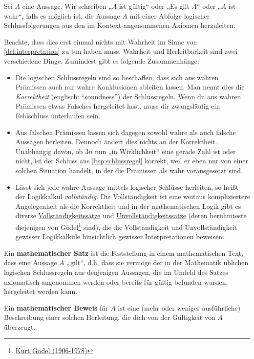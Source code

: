 \begin{defin}
    Sei $A$ eine Aussage. Wir schreiben „$A$ ist gültig“ oder „Es gilt $A$“ oder „$A$ ist wahr“, falls es möglich ist, die Aussage $A$ mit einer Abfolge logischer Schlussfolgerungen aus den im Kontext angenommenen Axiomen herzuleiten.
\end{defin}
 
 
\begin{bem} \label{beweisbarvswahr}
    Beachte, dass dies erst einmal nichts mit Wahrheit im Sinne von \cref{def:interpretation} zu tun haben muss. Wahrheit und Herleitbarkeit sind zwei verschiedene Dinge. Zumindest gibt es folgende Zusammenhänge:
    \begin{itemize}
        \item Die logischen Schlussregeln sind so beschaffen, dass sich aus wahren Prämissen auch nur wahre Konklusionen ableiten lassen. Man nennt dies die \emph{Korrektheit} (englisch: ``soundness'') der Schlussregeln. Wenn du aus wahren Prämissen etwas Falsches hergeleitet hast, muss dir zwangsläufig ein Fehlschluss unterlaufen sein.
        \item Aus falschen Prämissen lassen sich dagegen sowohl wahre als auch falsche Aussagen herleiten. Dennoch ändert dies nichts an der Korrektheit. Unabhängig davon, ob $3n$ nun „in Wirklichkeit“ eine gerade Zahl ist oder nicht, ist der Schluss aus \cref{bsp:schlussregel} korrekt, weil er eben nur von einer solchen Situation handelt, in der die Prämissen als wahr vorausgesetzt sind.
        \item Lässt sich jede wahre Aussage mittels logischer Schlüsse herleiten, so heißt der Logikkalkül \emph{vollständig}. Die Vollständigkeit ist eine weitaus kompliziertere Angelegenheit als die Korrektheit und in der mathematischen Logik gibt es diverse \href{https://ncatlab.org/nlab/show/completeness+theorem}{Vollständigkeitssätze} und \href{https://ncatlab.org/nlab/show/incompleteness+theorem}{Unvollständigkeitssätze} (deren berühmteste diejenigen von Gödel\footnote{\href{https://de.wikipedia.org/wiki/Kurt_G\%C3\%B6del}{Kurt Gödel (1906-1978)}} sind), die die Vollständigkeit und Unvollständigkeit gewisser Logikkalküle hinsichtlich gewisser Interpretationen beweisen.
    \end{itemize}
\end{bem}


\begin{defin} 
    Ein \textbf{mathematischer Satz} ist die Feststellung in einem mathematischen Text, dass eine Aussage $A$ „gilt“, d.h. dass sie vermöge der in der Mathematik üblichen logischen Schlussregeln aus denjenigen Aussagen, die im Umfeld des Satzes axiomatisch angenommen werden oder bereits für gültig befunden wurden, hergeleitet werden kann.
    
    Ein \textbf{mathematischer Beweis} für $A$ ist eine (mehr oder weniger ausführliche) Beschreibung einer solchen Herleitung, die dich von der Gültigkeit von $A$ überzeugt.
\end{defin}


